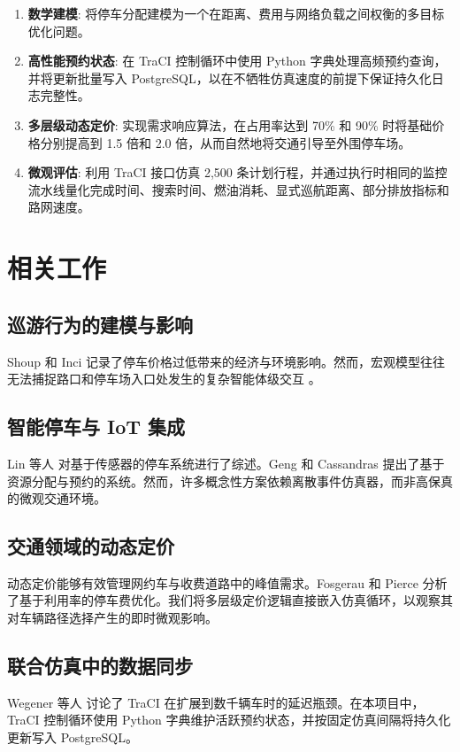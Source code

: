 \documentclass[conference]{IEEEtran}
\begin{document}
\begin{enumerate}
    \item \textbf{数学建模}: 将停车分配建模为一个在距离、费用与网络负载之间权衡的多目标优化问题。
    \item \textbf{高性能预约状态}: 在 TraCI 控制循环中使用 Python 字典处理高频预约查询，并将更新批量写入 PostgreSQL，以在不牺牲仿真速度的前提下保证持久化日志完整性。
    \item \textbf{多层级动态定价}: 实现需求响应算法，在占用率达到 70\% 和 90\% 时将基础价格分别提高到 1.5 倍和 2.0 倍，从而自然地将交通引导至外围停车场。
    \item \textbf{微观评估}: 利用 TraCI 接口仿真 2,500 条计划行程，并通过执行时相同的监控流水线量化完成时间、搜索时间、燃油消耗、显式巡航距离、部分排放指标和路网速度。
\end{enumerate}

\section{相关工作}

\subsection{巡游行为的建模与影响}
Shoup \cite{b1} 和 Inci \cite{b2} 记录了停车价格过低带来的经济与环境影响。然而，宏观模型往往无法捕捉路口和停车场入口处发生的复杂智能体级交互 \cite{b5}。

\subsection{智能停车与 IoT 集成}
Lin 等人 \cite{b3} 对基于传感器的停车系统进行了综述。Geng 和 Cassandras \cite{b4} 提出了基于资源分配与预约的系统。然而，许多概念性方案依赖离散事件仿真器，而非高保真的微观交通环境。

\subsection{交通领域的动态定价}
动态定价能够有效管理网约车与收费道路中的峰值需求。Fosgerau \cite{b6} 和 Pierce \cite{b7} 分析了基于利用率的停车费优化。我们将多层级定价逻辑直接嵌入仿真循环，以观察其对车辆路径选择产生的即时微观影响。

\subsection{联合仿真中的数据同步}
Wegener 等人 \cite{b8} 讨论了 TraCI 在扩展到数千辆车时的延迟瓶颈。在本项目中，TraCI 控制循环使用 Python 字典维护活跃预约状态，并按固定仿真间隔将持久化更新写入 PostgreSQL。
\end{document}
